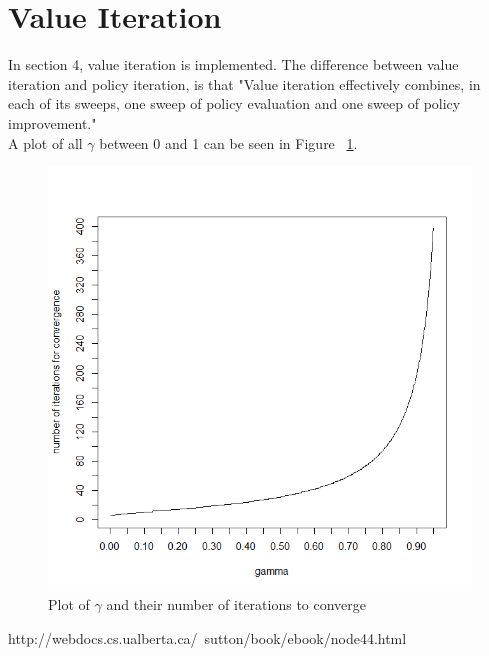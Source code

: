 \documentclass[11pt]{article}
\begin{document}
\section{Value Iteration}
In section 4, value iteration is implemented. The difference between value iteration and policy iteration, is that "Value iteration effectively combines, in each of its sweeps, one sweep of policy evaluation and one sweep of policy improvement." \cite{barto1}\\
A plot of all $\gamma$ between 0 and 1 can be seen in Figure ~\ref{plot}.
\begin{figure}
\centering
\includegraphics[scale=0.8]{a14.png}
\caption{Plot of $\gamma$ and their number of iterations to converge}
\label{plot}
\end{figure}






\begin{thebibliography}{7}

 http://webdocs.cs.ualberta.ca/~sutton/book/ebook/node44.html


\end{thebibliography}
\end{document}
